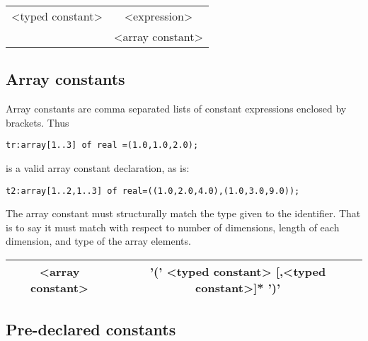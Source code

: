 \vspace{0.3cm}
{\centering \begin{tabular}{|c|c|}
\hline 
<typed constant>&
<expression>\\
&
<array constant>\\
\hline 
\end{tabular}\par}
\vspace{0.3cm}


\subsection{Array constants}

Array constants are comma separated lists of constant expressions enclosed by
brackets. Thus 

\texttt{tr:array{[}1..3{]} of real =(1.0,1.0,2.0);}

is a valid array constant declaration, as is:

{\small
\texttt{t2:array{[}1..2,1..3{]} of real=((1.0,2.0,4.0),(1.0,3.0,9.0));}}

The array constant must structurally
match the type given to the identifier. That is to say it must
match with respect to number of dimensions, length of each dimension, and type
of the array elements.

\vspace{0.3cm}
{\centering \begin{tabular}{|c|c|}
\hline 
<array constant>&
'(' <typed constant> {[},<typed constant>{]}{*} ')'\\
\hline 
\end{tabular}\par}
\vspace{0.3cm}


\subsection{Pre-declared constants}

